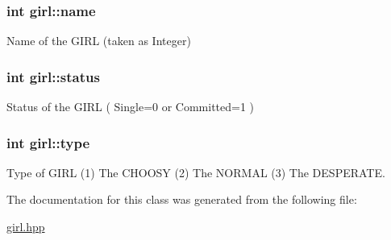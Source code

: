 \hypertarget{classgirl_a448de26f9f39423d14da2a98a1ab976b}{
\subsubsection[{name}]{\setlength{\rightskip}{0pt plus 5cm}int girl\-::name}}\label{classgirl_a448de26f9f39423d14da2a98a1ab976b}


Name of the G\-I\-R\-L (taken as Integer) 

\hypertarget{classgirl_a3c12399f01c1068062fbefb2206d5457}{
\subsubsection[{status}]{\setlength{\rightskip}{0pt plus 5cm}int girl\-::status}}\label{classgirl_a3c12399f01c1068062fbefb2206d5457}


Status of the G\-I\-R\-L ( Single=0 or Committed=1 ) 

\hypertarget{classgirl_a8e02617b5ea362f8c1311713de02f977}{
\subsubsection[{type}]{\setlength{\rightskip}{0pt plus 5cm}int girl\-::type}}\label{classgirl_a8e02617b5ea362f8c1311713de02f977}


Type of G\-I\-R\-L (1) The C\-H\-O\-O\-S\-Y (2) The N\-O\-R\-M\-A\-L (3) The D\-E\-S\-P\-E\-R\-A\-T\-E. 



The documentation for this class was generated from the following file\-:\begin{DoxyCompactItemize}
\item 
\hyperlink{girl_8hpp}{girl.\-hpp}\end{DoxyCompactItemize}
